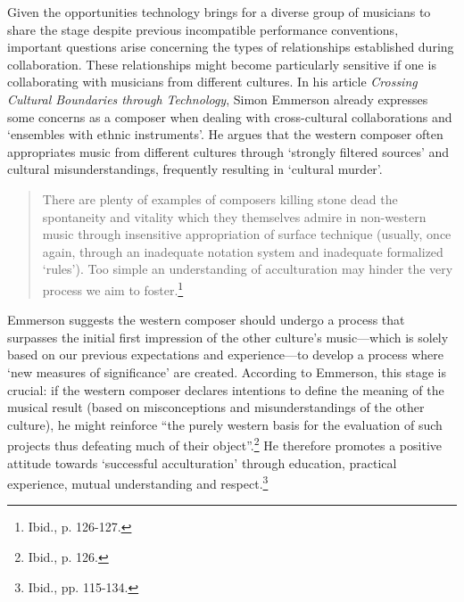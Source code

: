 Given the opportunities technology brings for a diverse group of musicians to share the stage despite previous incompatible performance conventions, important questions arise concerning the types of relationships established during collaboration. These relationships might become particularly sensitive if one is collaborating with musicians from different cultures. In his article \emph{Crossing Cultural Boundaries through Technology}, Simon Emmerson already expresses some concerns as a composer when dealing with cross-cultural collaborations and `ensembles with ethnic instruments'. He argues that the western composer often appropriates music from different cultures through `strongly filtered sources' and cultural misunderstandings, frequently resulting in `cultural murder'. 
\begin{quote}
There are plenty of examples of composers killing stone dead the spontaneity and vitality which they themselves admire in non-western music through insensitive appropriation of surface technique (usually, once again, through an inadequate notation system and inadequate formalized `rules'). Too simple an understanding of acculturation may hinder the very process we aim to foster.\footnote{Ibid., p. 126-127.} 
\end{quote}

Emmerson suggests the western composer should undergo a process that surpasses the initial first impression of the other culture's music---which is solely based on our previous expectations and experience---to develop a process where `new measures of significance' are created. According to Emmerson, this stage is crucial: if the western composer declares intentions to define the meaning of the musical result (based on misconceptions and misunderstandings of the other culture), he might reinforce ``the purely western basis for the evaluation of such projects thus defeating much of their object''.\footnote{Ibid., p. 126.} He therefore promotes a positive attitude towards `successful acculturation' through education, practical experience, mutual understanding and respect.\footnote{Ibid., pp. 115-134.} 


